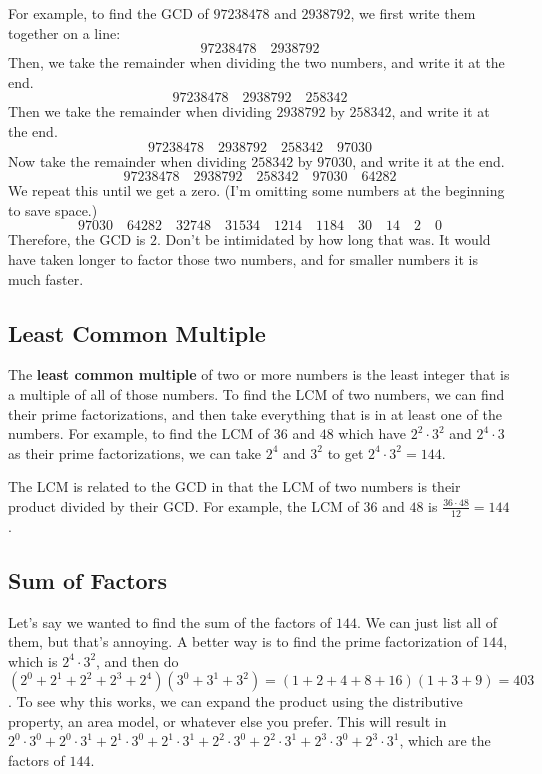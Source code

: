 \documentclass[twocolumn]{article}
\begin{document}
For example, to find the GCD of $97238478$ and $2938792$, we first write them together on a line:
\[97238478 \quad 2938792\]
Then, we take the remainder when dividing the two numbers, and write it at the end.
\[97238478 \quad 2938792 \quad 258342\]
Then we take the remainder when dividing $2938792$ by $258342$, and write it at the end.
\[97238478 \quad 2938792 \quad 258342 \quad 97030\]
Now take the remainder when dividing $258342$ by $97030$, and write it at the end.
\[97238478 \quad 2938792 \quad 258342 \quad 97030 \quad 64282\]
We repeat this until we get a zero.
(I'm omitting some numbers at the beginning to save space.)
\[97030 \quad 64282 \quad 32748 \quad 31534 \quad 1214 \quad 1184 \quad 30 \quad 14 \quad 2
\quad 0\]
Therefore, the GCD is $2$.
Don't be intimidated by how long that was.
It would have taken longer to factor those two numbers,
and for smaller numbers it is much faster.

\subsection*{Least Common Multiple}
The \textbf{least common multiple} of two or more numbers is the least integer that is a multiple
of all of those numbers.
To find the LCM of two numbers, we can find their prime factorizations, and then take everything
that is in at least one of the numbers.
For example, to find the LCM of $36$ and $48$ which have $2^2 \cdot 3^2$ and $2^4 \cdot 3$
as their prime factorizations, we can take $2^4$ and $3^2$ to get $2^4 \cdot 3^2 = 144$.

The LCM is related to the GCD in that the LCM of two numbers is their product divided by their GCD.
For example, the LCM of $36$ and $48$ is $\frac{36 \cdot 48}{12} = 144$.

\subsection*{Sum of Factors}
Let's say we wanted to find the sum of the factors of $144$.
We can just list all of them, but that's annoying.
A better way is to find the prime factorization of $144$, which is $2^4 \cdot 3^2$,
and then do $(2^0 + 2^1 + 2^2 + 2^3 + 2^4)(3^0 + 3^1 + 3^2)
= (1 + 2 + 4 + 8 + 16)(1 + 3 + 9) = 403$.
To see why this works, we can expand the product using the distributive property,
an area model, or whatever else you prefer.
This will result in $2^0 \cdot 3^0 + 2^0 \cdot 3^1 + 2^1 \cdot 3^0 + 2^1 \cdot 3^1 + 2^2 \cdot 3^0
+ 2^2 \cdot 3^1 + 2^3 \cdot 3^0 + 2^3 \cdot 3^1$, which are the factors of $144$.
\end{document}
